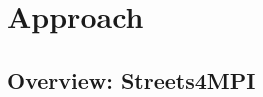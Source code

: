 \chapter{Approach}
\label{chap:Aproach}

\section{Overview: Streets4MPI}
\label{sec:Overview_Streets4MPI}
